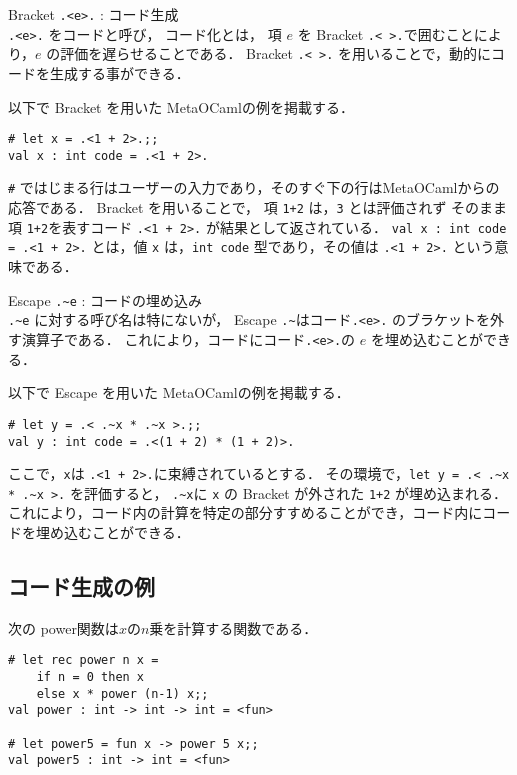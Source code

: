 \begin{description}
\item Bracket \lstinline|.<e>.| : コード生成 \mbox{}\\
  \lstinline|.<e>.| をコードと呼び，
  コード化とは， 項 $e$ を Bracket \lstinline|.< >.|で囲むことにより，$e$ の評価を遅らせることである．
  Bracket \lstinline|.< >.| を用いることで，動的にコードを生成する事ができる．

  以下で Bracket を用いた MetaOCamlの例を掲載する．
\begin{lstlisting}
# let x = .<1 + 2>.;;
val x : int code = .<1 + 2>.
\end{lstlisting}
  \lstinline|#| ではじまる行はユーザーの入力であり，そのすぐ下の行はMetaOCamlからの応答である．
  Bracket を用いることで， 項 \lstinline|1+2| は，\lstinline|3| とは評価されず そのまま項 \lstinline|1+2|を表すコード \lstinline|.<1 + 2>.| が結果として返されている．
  \lstinline|val x : int code = .<1 + 2>.| とは，値 \lstinline|x| は，\lstinline|int code| 型であり，その値は \lstinline|.<1 + 2>.| という意味である．
\item Escape \lstinline|.~e| : コードの埋め込み\mbox{}\\
  \lstinline|.~e| に対する呼び名は特にないが，
  Escape \lstinline|.~|はコード\lstinline|.<e>.| のブラケットを外す演算子である．
  これにより，コードにコード\lstinline|.<e>.|の $e$ を埋め込むことができる．

  以下で Escape を用いた MetaOCamlの例を掲載する．
\begin{lstlisting}
# let y = .< .~x * .~x >.;;
val y : int code = .<(1 + 2) * (1 + 2)>.
\end{lstlisting}
  ここで，\lstinline|x|は \lstinline|.<1 + 2>.|に束縛されているとする．
  その環境で，\lstinline|let y = .< .~x * .~x >.| を評価すると，
  \lstinline|.~x|に \lstinline|x| の Bracket が外された \lstinline|1+2| が埋め込まれる．
  これにより，コード内の計算を特定の部分すすめることができ，コード内にコードを埋め込むことができる．

\end{description}

\subsection{コード生成の例}
次の power関数は$x$の$n$乗を計算する関数である．
\begin{lstlisting}
# let rec power n x =
    if n = 0 then x
    else x * power (n-1) x;;
val power : int -> int -> int = <fun>

# let power5 = fun x -> power 5 x;;
val power5 : int -> int = <fun>
\end{lstlisting}

